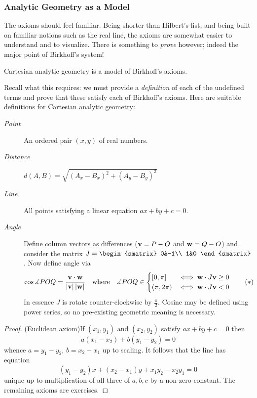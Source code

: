 \subsubsection*{Analytic Geometry as a Model}

The axioms should feel familiar. Being shorter than Hilbert's list, and being built on familiar notions such as the real line, the axioms are somewhat easier to understand and to visualize. There is something to \emph{prove} however; indeed the major point of Birkhoff's system!

\begin{thm}{}{}
	Cartesian analytic geometry is a model of Birkhoff's axioms.
\end{thm}

Recall what this requires: we must provide a \emph{definition} of each of the undefined terms and prove that these satisfy each of Birkhoff's axioms. Here are suitable definitions for Cartesian analytic geometry:
\begin{description}
	\item[\normalfont\emph{Point}] An ordered pair $(x,y)$ of real numbers.
	\item[\normalfont\emph{Distance}] $d(A,B)=\sqrt{(A_x-B_x)^2+(A_y-B_y)^2}$
	\item[\normalfont\emph{Line}] All points satisfying a linear equation $ax+by+c=0$.
	\item[\normalfont\emph{Angle}] Define column vectors as differences (${\mathbf{v}}=P-O$ and ${\mathbf{w}}=Q-O$) and consider the matrix $J=
	\begin{smatrix}
		0&-1\\
		1&0
	\end{smatrix}$. 
	Now define angle via
	\[
		\cos\measuredangle POQ=\frac{{\mathbf{v}}\cdot{\mathbf{w}}}{\left| {\mathbf{v}}\right|\left| {\mathbf{w}}\right|}
		\quad\text{where}\quad
		\measuredangle POQ\in
		\begin{cases}
			[0,\pi]&\iff{\mathbf{w}}\cdot J{\mathbf{v}}\ge 0\\
			(\pi,2\pi)&\iff{\mathbf{w}}\cdot J{\mathbf{v}}< 0
		\end{cases}
		\tag{$\ast$}
	\]
	In essence $J$ is rotate counter-clockwise by $\frac\pi 2$. Cosine may be defined using power series, so no pre-existing geometric meaning is necessary.
\end{description}

\begin{proof}
	(Euclidean axiom)\quad If $(x_1,y_1)$ and $(x_2,y_2)$ satisfy $ax+by+c=0$ then
	\[
		a(x_1-x_2)+b(y_1-y_2)=0
	\]
	whence $a=y_1-y_2$, $b=x_2-x_1$ up to scaling. It follows that the line has equation
	\[
		(y_1-y_2)x+(x_2-x_1)y+x_1y_2-x_2y_1=0
	\]
	unique up to multiplication of all three of $a,b,c$ by a non-zero constant.\smallbreak
	The remaining axioms are exercises.
\end{proof}


